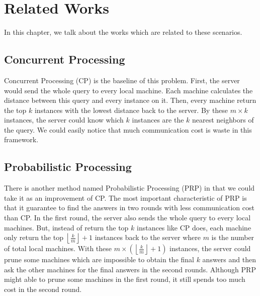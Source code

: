 \chapter{Related Works}
\label{c:related}

In this chapter, we talk about the works which are related to these scenarios. \\

\section{Concurrent Processing} %
\label{s:concurrent_processing}
Concurrent Processing (CP) \cite{PRP} is the baseline of this problem.  First, the server would send the whole query to every local machine.  Each machine calculates the distance between this query and every instance on it.  Then, every machine return the top $k$ instances with the lowest distance back to the server.  By these $m\times k$ instances, the server could know which $k$ instances are the $k$ nearest neighbors of the query.  We could easily notice that much communication cost is waste in this framework.

\section{Probabilistic Processing} %
\label{s:probabilistic_processing}
\providecommand{\myfloor}[1]{\left \lfloor #1 \right \rfloor }
There is another method named Probabilistic Processing (PRP) in \cite{PRP} that we could take it as an improvement of CP. The most important characteristic of PRP is that it guarantee to find the answers in two rounds with less communication cost than CP.  In the first round, the server also sends the whole query to every local machines.  But, instead of return the top $k$ instances like CP does, each machine only return the top $\myfloor{\frac{k}{m}}+1$ instances back to the server where $m$ is the number of total local machines.  With these $m \times(\myfloor{\frac{k}{m}}+1)$ instances, the server could prune some machines which are impossible to obtain the final $k$ answers and then ask the other machines for the final answers in the second rounds.  Although PRP might able to prune some machines in the first round, it still spends too much cost in the second round.


